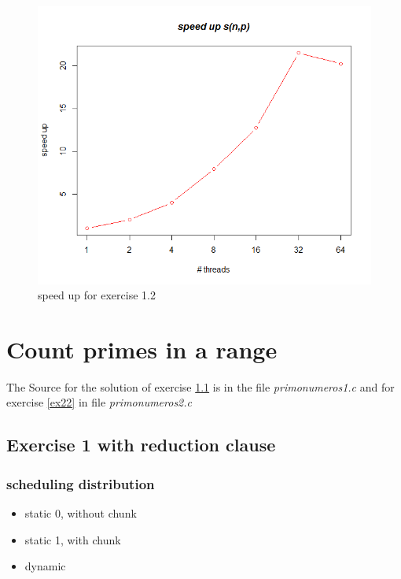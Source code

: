\documentclass[11pt,a4paper]{article}
\begin{document}
\begin{figure}[h]
\centering
  \includegraphics[scale=0.35]{statistics/Ex12SpeedUpGraph.png}
	\caption{speed up for exercise 1.2}
	\label{ex12speedUp}
\end{figure}



\pagebreak

\section{Count primes in a range}

The Source for the solution of exercise \ref{ex21} is in the file
 \textit{primo\textunderscore numeros\textunderscore 1.c} and
 for exercise \ref{ex22} in file \textit{primo\textunderscore numeros\textunderscore 2.c}

\subsection{Exercise 1 with reduction clause}
\label{ex21}
\subsubsection{scheduling distribution}


\begin{itemize}
\item static 0, without chunk
\item static 1, with chunk
\item dynamic
\end{itemize}
\end{document}
